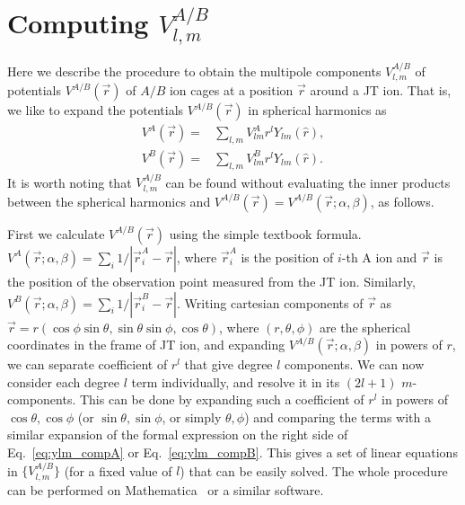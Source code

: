 \documentclass[a4paper,prb,twocolumn]{revtex4-1}  %
\begin{document}

\appendix*
\section{Computing $V_{l,m}^{A/B}$}
\label{append:multipoles}

Here we describe the procedure to obtain the multipole components 
$V_{l,m}^{A/B}$ of potentials $V^{A/B}(\vec r)$ of $A/B$ ion cages 
at a position $\vec r$ around a JT ion.
That is, we like to expand the potentials $V^{A/B}(\vec r)$
in spherical harmonics as
\begin{align}
\label{eq:ylm_compA}
V^{A}(\vec r) =& \sum_{l,m} V_{lm}^{A} r^l Y_{lm}(\hat r),\\
\label{eq:ylm_compB}
V^{B}(\vec r) =& \sum_{l,m} V_{lm}^{B} r^l Y_{lm}(\hat r).
\end{align}
It is worth noting that $V_{l,m}^{A/B}$ can be found without 
evaluating the 
inner products between the spherical harmonics and
$V^{A/B}(\vec r)=V^{A/B}(\vec r;\alpha,\beta)$, as follows.

First we calculate
$V^{A/B}(\vec r)$
using the simple textbook formula.
$V^{A}(\vec r;\alpha,\beta)=\sum_{i}1/|\vec r^A_i-\vec r |$, 
where $\vec r^A_i$ is the position of $i$-th A ion
and 
$\vec r$ is the position of the observation point 
measured from the JT ion.
Similarly,
$V^{B}(\vec r;\alpha,\beta)=\sum_{i}1/|\vec r^B_i-\vec r |$.
Writing cartesian components of $\vec r$ as
$\vec r=r(\cos\phi\sin\theta,\sin\theta\sin\phi,\cos\theta)$,
where $(r,\theta,\phi)$ 
are the spherical coordinates in the frame of JT ion,
and expanding 
${V^{A/B}(\vec r;\alpha,\beta)}$
in powers of $r$, 
we can separate 
coefficient of $r^l$
that give degree $l$ components.
We can now consider each degree $l$ term individually,
and resolve it in its $(2l+1)$ $m$-components.
This can be done by 
expanding such a coefficient of $r^l$
in powers of $\cos\theta, \cos\phi$ 
(or $\sin\theta, \sin\phi$, or simply $\theta,\phi$) 
and comparing the terms with a similar expansion of 
the formal expression on the right side 
of Eq.~\ref{eq:ylm_compA} or Eq.~\ref{eq:ylm_compB}.
This gives a set of
linear equations in $\{V_{l,m}^{A/B}\}$ (for a fixed value of $l$)
 that can be easily solved.
The whole procedure can be performed
 on Mathematica~\cite{Mathematica}
or a similar software.



\label{Bibliography}
%

\end{document}
